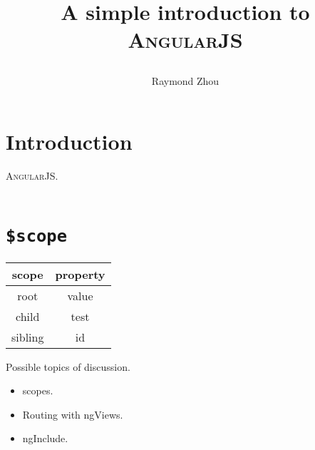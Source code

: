 \documentclass[12pt]{article}
\title{A simple introduction to \textsc{AngularJS}\date{}}
\author{Raymond Zhou}
\begin{document}
\fancyhf{}
\fancyfoot[C]{\thepage}
\renewcommand{\footrulewidth}{0.4pt}  %

\maketitle{}
\linenumbers

\section{Introduction}

\textsc{AngularJS}.
\\\\
\section{\texttt{\$scope}}

\begin{center}
  \begin{tabular}{cc}
    \toprule
      \textbf{scope} & \textbf{property}\tabularnewline
    \midrule
      root           & value \tabularnewline
      child          & test  \tabularnewline
      sibling        & id    \tabularnewline
    \bottomrule
  \end{tabular}
\end{center}

\begin{center}
  \begin{tikzpicture}

  \end{tikzpicture}
\end{center}

Possible topics of discussion.

\begin{itemize}
  \item scopes.
  \item Routing with ngViews.
  \item ngInclude.

\end{itemize}
\end{document}
